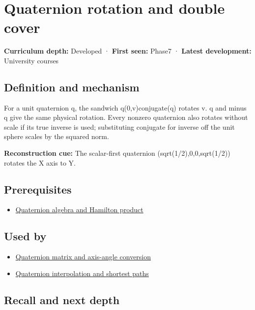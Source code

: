 \hypertarget{appendix-8e61ab68f6b2}{}\label{referencestart:appendix-8e61ab68f6b2}
\section{Quaternion rotation and double cover}\label{appendix-8e61ab68f6b2-quaternion-rotation-and-double-cover}

\textbf{Curriculum depth:} Developed · \textbf{First seen:} Phase7 · \textbf{Latest development:} University courses

\subsection{Definition and mechanism}\label{appendix-8e61ab68f6b2-definition-and-mechanism}

For a unit quaternion q, the sandwich q(0,v)conjugate(q) rotates v. q and minus q give the same physical rotation. Every nonzero quaternion also rotates without scale if its true inverse is used; substituting conjugate for inverse off the unit sphere scales by the squared norm.

\textbf{Reconstruction cue:} The scalar-first quaternion (sqrt(1/2),0,0,sqrt(1/2)) rotates the X axis to Y.

\subsection{Prerequisites}\label{appendix-8e61ab68f6b2-prerequisites}

\begin{itemize}
\tightlist
\item
  \hyperref[appendix-965d9260eeab]{Quaternion algebra and Hamilton product}
\end{itemize}

\subsection{Used by}\label{appendix-8e61ab68f6b2-used-by}

\begin{itemize}
\tightlist
\item
  \hyperref[appendix-26d8da71f6c4]{Quaternion matrix and axis-angle conversion}
\item
  \hyperref[appendix-9b4b8254f26b]{Quaternion interpolation and shortest paths}
\end{itemize}

\subsection{Recall and next depth}\label{appendix-8e61ab68f6b2-recall-and-next-depth}

